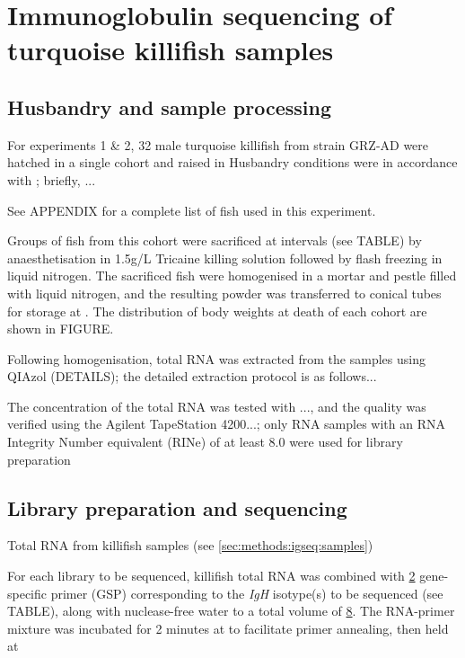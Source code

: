 \section{Immunoglobulin sequencing of turquoise killifish samples}

\subsection{Husbandry and sample processing}
\label{sec:methods:igseq:samples}

For experiments 1 \& 2, 32 male turquoise killifish from strain GRZ-AD were hatched in a single cohort and raised in %
Husbandry conditions were in accordance with %
; briefly, ...

See APPENDIX for a complete list of fish used in this experiment.

Groups of fish from this cohort were sacrificed at intervals (see TABLE) by anaesthetisation in 1.5g/L Tricaine killing solution followed by flash freezing in liquid nitrogen. The sacrificed fish were homogenised in a mortar and pestle filled with liquid nitrogen, and the resulting powder was transferred to  conical tubes for storage at . The distribution of body weights at death of each cohort are shown in FIGURE. %

Following homogenisation, total RNA was extracted from the samples using QIAzol (DETAILS); the detailed extraction protocol is as follows...

The concentration of the total RNA was tested with ..., and the quality was verified using the Agilent TapeStation 4200...; only RNA samples with an RNA Integrity Number equivalent (RINe) of at least 8.0 were used for library preparation %

\subsection{Library preparation and sequencing}

Total RNA from killifish samples (see \autoref{sec:methods:igseq:samples}) 

For each library to be sequenced,  killifish total RNA was combined with \ul{2}  gene-specific primer (GSP) corresponding to the \textit{IgH} isotype(s) to be sequenced (see TABLE), along with nuclease-free water to a total volume of \ul{8}. The RNA-primer mixture was incubated for 2 minutes at  to facilitate primer annealing, then held at  %

